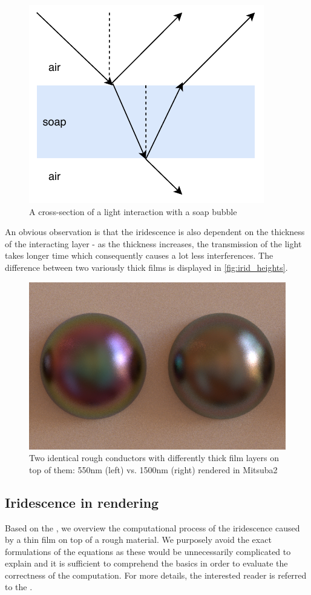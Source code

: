 \begin{figure}[h]
	\centering
	\includegraphics[width=.6\linewidth]{img/soap.pdf}
	\caption{A cross-section of a light interaction with a soap bubble}
	\label{fig:soap}
\end{figure}

An obvious observation is that the iridescence is also dependent on the thickness of the interacting layer - as the thickness increases, the transmission of the light takes longer time which consequently causes a lot less interferences. The difference between two variously thick films is displayed in \autoref{fig:irid_heights}.

\begin{figure}[h]
	\centering
	\includegraphics[width=.6\linewidth]{img/irid_heights.png}
	\caption{Two identical rough conductors with differently thick film layers on top of them: 550nm (left) vs. 1500nm (right) rendered in Mitsuba2}
	\label{fig:irid_heights}
\end{figure}

\subsection{Iridescence in rendering}

Based on the \citet{belcour2017practical}, we overview the computational process of the iridescence caused by a thin film on top of a rough material. We purposely avoid the exact formulations of the equations as these would be unnecessarily complicated to explain and it is sufficient to comprehend the basics in order to evaluate the correctness of the computation. For more details, the interested reader is referred to the \citet{belcour2017practical}.

